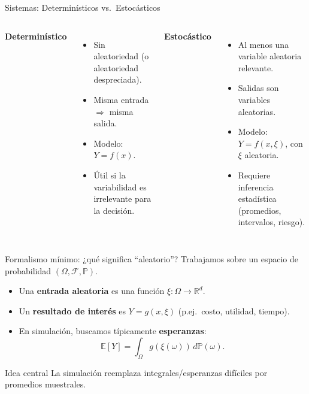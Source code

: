 \documentclass[aspectratio=1610, 9pt]{beamer}
\begin{document}
\begin{frame}{Sistemas: Determinísticos vs.\ Estocásticos}
\begin{columns}
\textbf{Determinístico}
\begin{itemize}
  \item Sin aleatoriedad (o aleatoriedad despreciada).
  \item Misma entrada $\Rightarrow$ misma salida.
  \item Modelo: $Y = f(x)$.
  \item Útil si la variabilidad es irrelevante para la decisión.
\end{itemize}

\textbf{Estocástico}
\begin{itemize}
  \item Al menos una variable aleatoria relevante.
  \item Salidas son variables aleatorias.
  \item Modelo: $Y = f(x,\xi)$, con $\xi$ aleatoria.
  \item Requiere inferencia estadística (promedios, intervalos, riesgo).
\end{itemize}
\end{columns}
\end{frame}

\begin{frame}{Formalismo mínimo: ¿qué significa “aleatorio”?}
Trabajamos sobre un espacio de probabilidad $(\Omega,\mathcal F,\mathbb P)$.

\begin{itemize}
  \item Una \textbf{entrada aleatoria} es una función $\xi:\Omega\to\mathbb R^d$.
  \item Un \textbf{resultado de interés} es $Y = g(x, \xi)$ (p.ej.\ costo, utilidad, tiempo).
  \item En simulación, buscamos típicamente \textbf{esperanzas}:
  \[
  \mathbb E[Y] = \int_{\Omega} g(\xi(\omega))\, d\mathbb P(\omega).
  \]
\end{itemize}

\begin{block}{Idea central}
La simulación reemplaza integrales/esperanzas difíciles por promedios muestrales.
\end{block}
\end{frame}
\end{document}
